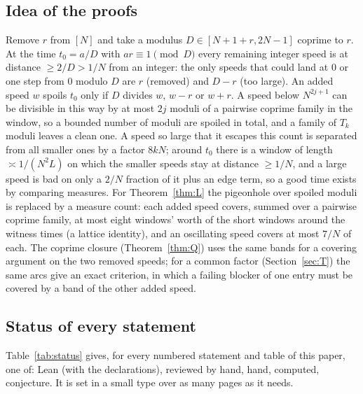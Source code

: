 \documentclass[11pt]{article}
\theoremstyle{definition}
\theoremstyle{remark}
\begin{document}
\subsection{Idea of the proofs}
Remove $r$ from $[N]$ and take a modulus $D\in[N+1+r,2N-1]$ coprime to $r$. At the time $t_0=a/D$ with $ar\equiv1\pmod D$ every remaining integer speed is at distance $\ge2/D>1/N$ from an integer: the only speeds that could land at $0$ or one step from $0$ modulo $D$ are $r$ (removed) and $D-r$ (too large). An added speed $w$ spoils $t_0$ only if $D$ divides $w$, $w-r$ or $w+r$. A speed below $N^{2j+1}$ can be divisible in this way by at most $2j$ moduli of a pairwise coprime family in the window, so a bounded number of moduli are spoiled in total, and a family of $T_k$ moduli leaves a clean one. A speed so large that it escapes this count is separated from all smaller ones by a factor $8kN$; around $t_0$ there is a window of length $\asymp1/(N^2L)$ on which the smaller speeds stay at distance $\ge1/N$, and a large speed is bad on only a $2/N$ fraction of it plus an edge term, so a good time exists by comparing measures. For Theorem~\ref{thm:L} the pigeonhole over spoiled moduli is replaced by a measure count: each added speed covers, summed over a pairwise coprime family, at most eight windows' worth of the short windows around the witness times (a lattice identity), and an oscillating speed covers at most $7/N$ of each. The coprime closure (Theorem~\ref{thm:Q}) uses the same bands for a covering argument on the two removed speeds; for a common factor (Section~\ref{sec:T}) the same arcs give an exact criterion, in which a failing blocker of one entry must be covered by a band of the other added speed.

\subsection{Status of every statement}\label{sec:status}
Table~\ref{tab:status} gives, for every numbered statement and table of this paper, one of: Lean (with the declarations), reviewed by hand, hand, computed, conjecture. It is set in a small type over as many pages as it needs.
\end{document}
